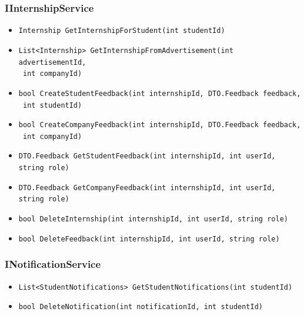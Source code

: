 \subsubsection{IInternshipService}
\begin{itemize}
    \item \verb|Internship GetInternshipForStudent(int studentId)|
    \item \verb|List<Internship> GetInternshipFromAdvertisement(int advertisementId,| \\ \makebox[10em][l]{} \verb| int companyId)|
    \item \verb|bool CreateStudentFeedback(int internshipId, DTO.Feedback feedback,| \\ \makebox[10em][l]{} \verb| int studentId)|
    \item \verb|bool CreateCompanyFeedback(int internshipId, DTO.Feedback feedback,| \\ \makebox[10em][l]{} \verb| int companyId)|
    \item \verb|DTO.Feedback GetStudentFeedback(int internshipId, int userId, string role)|
    \item \verb|DTO.Feedback GetCompanyFeedback(int internshipId, int userId, string role)|
    \item \verb|bool DeleteInternship(int internshipId, int userId, string role)|
    \item \verb|bool DeleteFeedback(int internshipId, int userId, string role)|
\end{itemize}

\subsubsection{INotificationService}
\begin{itemize}
    \item \verb|List<StudentNotifications> GetStudentNotifications(int studentId)|
    \item \verb|bool DeleteNotification(int notificationId, int studentId)|
\end{itemize}

